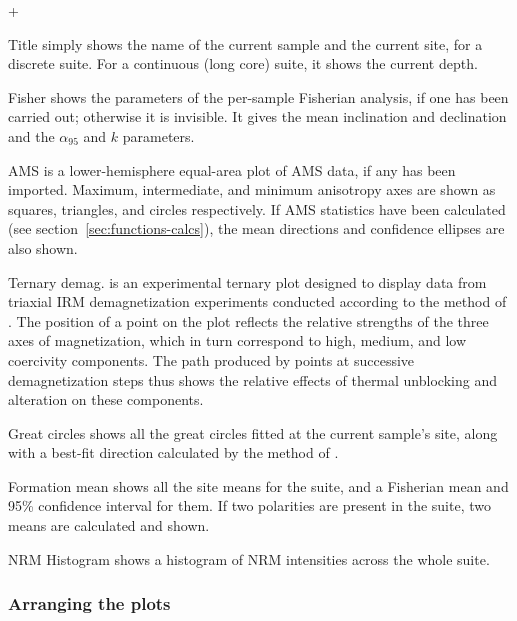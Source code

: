 \documentclass[a4paper,british]{article}
\newcommand{\menuitemlabel}[1]{%
\mbox{\textsf{#1}}\hfil}
\newenvironment{menuitemlist}%
{\begin{list}{}{%
\renewcommand{\makelabel}{\menuitemlabel}%
\setlength{\labelwidth}{35pt}%
\setlength{\leftmargin}%
             {\labelwidth+\labelsep}}}%
{\end{list}}
\newcommand{\caps}[1]{\MakeTextUppercase{#1}} %
\newcommand{\alnifi}{$\alpha_{95}$}
\begin{document}
\begin{menuitemlist}
\item[Title] simply shows the name of the current sample and
the current site, for a discrete suite. For a continuous (long core)
suite, it shows the current depth.

\item[Fisher] shows the parameters of the per-sample Fisherian analysis, if
  one has been carried out; otherwise it is invisible. It gives the mean
  inclination and declination and the \alnifi{} and $k$ parameters.

\item[\caps{Ams}] is a lower-hemisphere equal-area plot of
\caps{ams} data, if any has been imported. Maximum, intermediate, and
minimum anisotropy axes are shown as squares, triangles, and circles
respectively. If \caps{ams} statistics have been calculated (see
section~\ref{sec:functions-calcs}), the mean directions and
confidence ellipses are also shown.

\item[Ternary demag.] is an experimental ternary plot designed
to display data from triaxial \caps{irm} demagnetization experiments
conducted according to the method of \cite{lowrie1990identification}.
The position of a point on the plot reflects the relative strengths
of the three axes of magnetization, which in turn correspond to
high, medium, and low coercivity components. The path produced
by points at successive demagnetization steps thus shows the relative
effects of thermal unblocking and alteration on these components.

\item[Great circles] shows all the great circles fitted at
the current sample's site, along with a best-fit direction calculated
by the method of \cite{mcfadden1988circles}.

\item[Formation mean] shows all the site means for the suite,
and a Fisherian mean and 95\% confidence interval for them.
If two polarities are present in the suite, two means are calculated
and shown.

\item[\caps{Nrm} Histogram] shows a histogram of \caps{nrm}
intensities across the whole suite.

\end{menuitemlist}

\subsubsection{\label{sec:move-plots}Arranging the plots}
\end{document}
